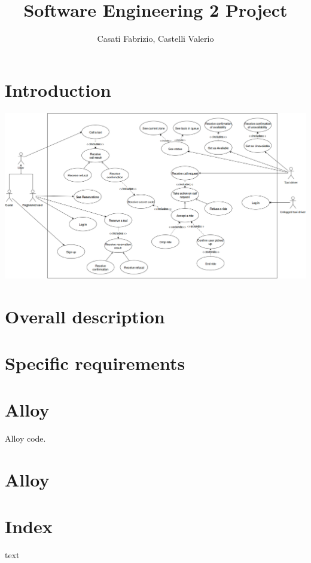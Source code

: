 

\usepackage{graphicx}

\usepackage{graphicx}
\usepackage{wrapfig}
\usepackage{lscape}
\usepackage{rotating}
\usepackage{epstopdf}
\usepackage{lscape}
\usepackage{pdflscape}
\usepackage{pdfpages}
\usepackage[titletoc]{appendix}%




\title{Software Engineering 2 Project}
\author{Casati Fabrizio, Castelli Valerio}

\maketitle
\tableofcontents

\chapter{Introduction}
\begin{landscape}
    \includegraphics[width=580pt, keepaspectratio]{files/index.png}
    \label{fig:PropProf}
\end{landscape}





\chapter{Overall description}


\chapter{Specific requirements}


\begin{appendices}
\chapter{Alloy}
Alloy code.

\chapter{Alloy}

\end{appendices}
\chapter*{Index}
text

